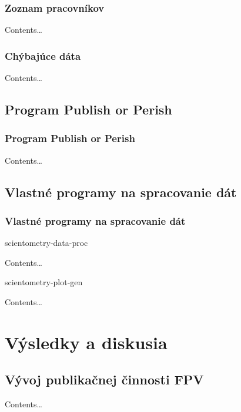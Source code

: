 \documentclass{beamer}
\begin{document}
\begin{frame}
\frametitle{Zoznam pracovníkov}

Contents\dots


\end{frame}

\begin{frame}
\frametitle{Chýbajúce dáta}

Contents\dots


\end{frame}


\subsection{Program Publish or Perish}

\begin{frame}
\frametitle{Program Publish or Perish}


Contents\dots


\end{frame}


\subsection{Vlastné programy na spracovanie dát}

\begin{frame}
\frametitle{Vlastné programy na spracovanie dát}

\begin{block}{scientometry-data-proc}

Contents\dots

\end{block}

\begin{block}{scientometry-plot-gen}

Contents\dots

\end{block}

\end{frame}


\section{Výsledky a diskusia}

\subsection{Vývoj publikačnej činnosti FPV}


\begin{frame}


Contents\dots


\end{frame}
\end{document}
